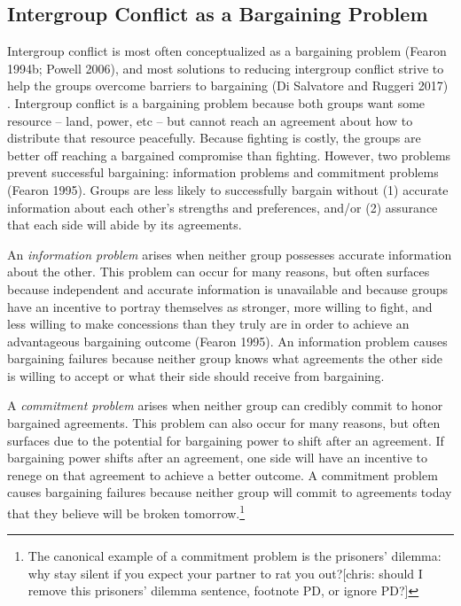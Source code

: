 \documentclass[11pt]{article}
\begin{document}
\hypertarget{intergroup-conflict-as-a-bargaining-problem}{%
\subsection{Intergroup Conflict as a Bargaining
Problem}\label{intergroup-conflict-as-a-bargaining-problem}}

Intergroup conflict is most often conceptualized as a bargaining problem
(Fearon 1994b; Powell 2006), and most solutions to reducing intergroup
conflict strive to help the groups overcome barriers to bargaining (Di
Salvatore and Ruggeri 2017) . Intergroup conflict is a bargaining
problem because both groups want some resource -- land, power, etc --
but cannot reach an agreement about how to distribute that resource
peacefully. Because fighting is costly, the groups are better off
reaching a bargained compromise than fighting. However, two problems
prevent successful bargaining: information problems and commitment
problems (Fearon 1995). Groups are less likely to successfully bargain
without (1) accurate information about each other's strengths and
preferences, and/or (2) assurance that each side will abide by its
agreements.

An \emph{information problem} arises when neither group possesses
accurate information about the other. This problem can occur for many
reasons, but often surfaces because independent and accurate information
is unavailable and because groups have an incentive to portray
themselves as stronger, more willing to fight, and less willing to make
concessions than they truly are in order to achieve an advantageous
bargaining outcome (Fearon 1995). An information problem causes
bargaining failures because neither group knows what agreements the
other side is willing to accept or what their side should receive from
bargaining.

A \emph{commitment problem} arises when neither group can credibly
commit to honor bargained agreements. This problem can also occur for
many reasons, but often surfaces due to the potential for bargaining
power to shift after an agreement. If bargaining power shifts after an
agreement, one side will have an incentive to renege on that agreement
to achieve a better outcome. A commitment problem causes bargaining
failures because neither group will commit to agreements today that they
believe will be broken tomorrow.\footnote{The canonical example of a
  commitment problem is the prisoners' dilemma: why stay silent if you
  expect your partner to rat you out?{[}chris: should I remove this
  prisoners' dilemma sentence, footnote PD, or ignore PD?{]}}
\end{document}
